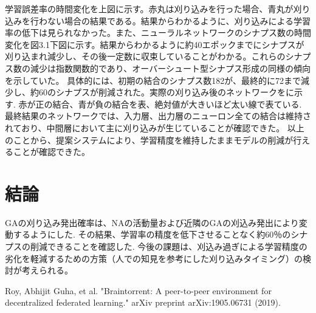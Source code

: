 \documentclass[a4paper, 10.5pt,twocolumn,dvipdfmx]{jsarticle}
\begin{document}
学習誤差率の時間変化を上図に示す。赤丸は刈り込みを行った場合、青丸が刈り込みを行わない場合の結果である。結果からわかるように、刈り込みによる学習率の低下は見られなかった。また、ニューラルネットワークのシナプス数の時間変化を図3.1下図に示す。結果からわかるように約40エポックまでにシナプスが刈り込まれ減少し、その後一定数に収束していることがわかる。これらのシナプス数の減少は指数関数的であり、オーバーシュート型シナプス形成の同様の傾向を示していた。
具体的には、初期の結合のシナプス数182が、最終的に72まで減少し、約60のシナプスが削減された。実際の刈り込み後のネットワークをに示す.
赤が正の結合、青が負の結合を表、絶対値が大きいほど太い線で表ている.
最終結果のネットワークでは、入力層、出力層のニューロン全ての結合は維持されており、中間層において主に刈り込みが生じていることが確認できた。
以上のことから、提案システムにより、学習精度を維持したままモデルの削減が行えることが確認できた。
\section{結論}
GAの刈り込み発出確率は、NAの活動量および近隣のGAの刈込み発出により変動するようにした.
その結果、学習率の精度を低下させることなく約60％のシナプスの削減できることを確認した.
今後の課題は、刈込み過ぎによる学習精度の劣化を軽減するための方策（人での知見を参考にした刈り込みタイミング）の検討が考えられる。
 \begin{thebibliography}{99}
  Roy, Abhijit Guha, et al. "Braintorrent: A peer-to-peer environment for decentralized federated learning." arXiv preprint arXiv:1905.06731 (2019).
\end{thebibliography}
 
\end{document}
